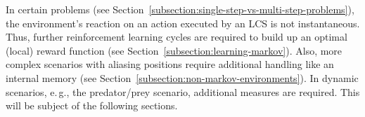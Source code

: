 


In certain problems (see Section~\ref{subsection:single-step-vs-multi-step-problems}), the environment's reaction on an action executed by an LCS is not instantaneous. Thus, further reinforcement learning cycles are required to build up an optimal (local) reward function (see Section~\ref{subsection:learning-markov}). Also, more complex scenarios with aliasing positions require additional handling like an internal memory (see Section~\ref{subsection:non-markov-environments}). In dynamic scenarios, e.\,g., the predator/prey scenario, additional measures are required. This will be subject of the following sections.


